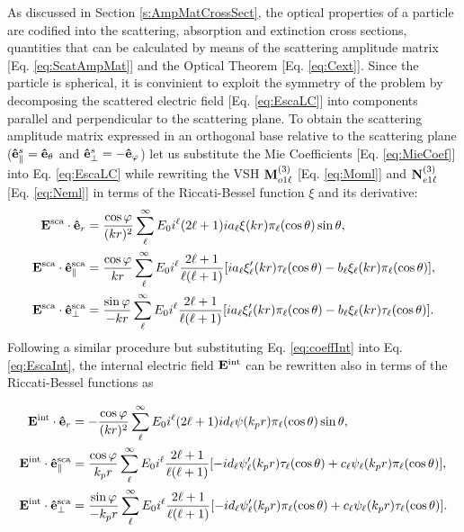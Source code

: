 As discussed in Section \ref{s:AmpMatCrossSect}, the optical properties of a particle are codified into the scattering, absorption and extinction cross sections, quantities that can be calculated by means of the scattering amplitude matrix [Eq. \eqref{eq:ScatAmpMat}] and the Optical Theorem [Eq. \eqref{eq:Cext}]. Since the particle is spherical, it is convinient to exploit the symmetry of the problem  by decomposing the scattered electric field [Eq. \eqref{eq:EscaLC}] into components parallel and perpendicular to the scattering plane. To obtain the scattering amplitude matrix  expressed in an orthogonal base relative to the scattering plane ($\vu{e}_\parallel^s =\vu{e}_\theta$ and $\vu{e}_\perp^s=-\vu{e}_\varphi$) let us substitute the Mie Coefficients [Eq. \eqref{eq:MieCoef}] into Eq. \eqref{eq:EscaLC}  while rewriting the VSH $\vb{M}^{(3)}_{o1\ell}$  [Eq. \eqref{eq:Moml}] and $\vb{N}^{(3)}_{e1\ell}$ [Eq. \eqref{eq:Neml}] in terms of the Riccati-Bessel function  $\xi$ and its derivative:
%
\begin{subequations}\label{eq:Esca}%
\begin{align}
\vb{E}^\text{sca}\cdot\vu{e}_r &=  \frac{\cos\varphi}{(kr)^2}
								\sum_\ell^\infty E_0i^\ell(2\ell+1)
								ia_\ell \xi(kr)\pi_\ell(\cos\theta) \sin\theta ,
\label{eq:EscaR}\\
\vb{E}^\text{sca}\cdot\vu{e}^\text{sca}_\parallel &=  \frac{\cos\varphi}{kr}
								\sum_\ell^\infty E_0i^\ell\frac{2\ell+1}{\ell(\ell+1)}
						[i a_\ell\xi_\ell'(kr)\tau_\ell(\cos\theta)-b_\ell\xi_\ell(kr)\pi_\ell(\cos\theta)],
\label{eq:EscaTheta}\\
\vb{E}^\text{sca}\cdot\vu{e}^\text{sca}_\perp &=  \frac{\sin\varphi}{-kr}
								\sum_\ell^\infty E_0i^\ell\frac{2\ell+1}{\ell(\ell+1)}
						[i a_\ell\xi_\ell'(kr)\pi_\ell(\cos\theta)-b_\ell\xi_\ell(kr)\tau_\ell(\cos\theta)].
\label{eq:EscaMPhi}
\end{align}%
\end{subequations}
%
Following a similar procedure but substituting Eq. \eqref{eq:coeffInt} into Eq. \eqref{eq:EscaInt}, the internal electric field $\vb{E}^\text{int}$ can be rewritten also in terms of the Riccati-Bessel functions as

\begin{subequations}\label{eq:Eint}%
\begin{align}
\vb{E}^\text{int}\cdot\vu{e}_r &=  -\frac{\cos\varphi}{(kr)^2}
               \sum_\ell^\infty E_0i^\ell(2\ell+1)
               id_\ell \psi(k_pr)\pi_\ell(\cos\theta) \sin\theta ,
\label{eq:EintR}\\
\vb{E}^\text{int}\cdot\vu{e}^\text{sca}_\parallel &=  \frac{\cos\varphi}{k_pr}
               \sum_\ell^\infty E_0i^\ell\frac{2\ell+1}{\ell(\ell+1)}
           [-i d_\ell\psi_\ell'(k_pr)\tau_\ell(\cos\theta)+c_\ell\psi_\ell(k_pr)\pi_\ell(\cos\theta)],
\label{eq:EscaTheta}\\
\vb{E}^\text{int}\cdot\vu{e}^\text{sca}_\perp &=  \frac{\sin\varphi}{-k_pr}
               \sum_\ell^\infty E_0i^\ell\frac{2\ell+1}{\ell(\ell+1)}
           [-i d_\ell\psi_\ell'(k_pr)\pi_\ell(\cos\theta)+c_\ell\psi_\ell(k_pr)\tau_\ell(\cos\theta)].
\label{eq:EintMPhi}
\end{align}%
\end{subequations}


